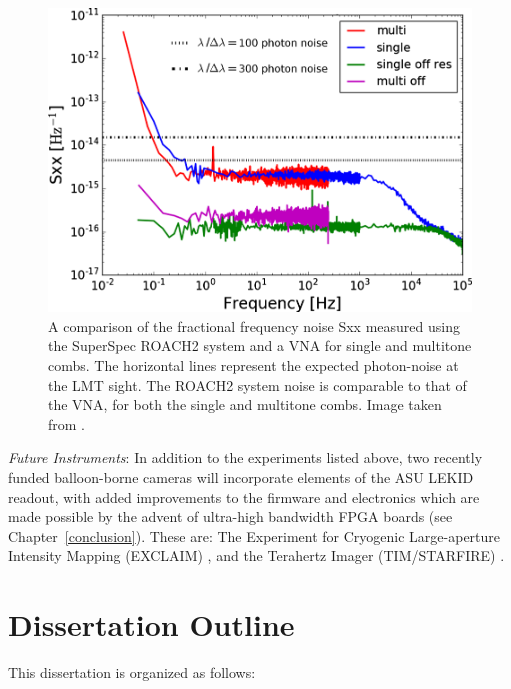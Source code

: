 \begin{figure}[!htbp]
\centering
\includegraphics[width=\textwidth]{figures/intro/superspec_noisecomp}
\caption[~Comparison of the fractional frequency noise measured using the SuperSpec ROACH2 system and a VNA for single and multitone combs.]{A comparison of the fractional frequency noise \gls{Sxx} measured using the SuperSpec ROACH2 system and a VNA for single and multitone combs. The horizontal lines represent the expected photon-noise at the LMT sight. The ROACH2 system noise is comparable to that of the VNA, for both the single and multitone combs. Image taken from \citet{mcgeehan2018low}.}
\label{fig:readout noise comp}
\end{figure}

\vspace{5mm}

\textit{Future Instruments}: In addition to the experiments listed above, two recently funded balloon-borne cameras will incorporate elements of the ASU LEKID readout, with added improvements to the firmware and electronics which are made possible by the advent of ultra-high bandwidth FPGA boards (see Chapter~\ref{conclusion}). These are: The Experiment for Cryogenic Large-aperture Intensity Mapping (EXCLAIM) \citep{switzer2017measuring}, and the Terahertz Imager (TIM/STARFIRE) \citep{aguirre2018starfire}.

\section{Dissertation Outline}

This dissertation is organized as follows:


